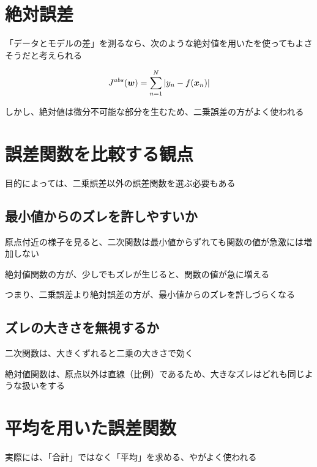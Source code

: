 \documentclass[../../../topic_machine-learning]{subfiles}
\begin{document}
\sectionline
\section{絶対誤差}

「データとモデルの差」を測るなら、次のような絶対値を用いたを使ってもよさそうだと考えられる

\begin{equation*}
  J^{abs}(\vb*{w}) = \sum_{n=1}^N \left| y_n - f(\vb*{x}_n) \right|
\end{equation*}

しかし、絶対値は微分不可能な部分を生むため、二乗誤差の方がよく使われる

\sectionline
\section{誤差関数を比較する観点}

目的によっては、二乗誤差以外の誤差関数を選ぶ必要もある

\subsection{最小値からのズレを許しやすいか}

原点付近の様子を見ると、二次関数は最小値からずれても関数の値が急激には増加しない

絶対値関数の方が、少しでもズレが生じると、関数の値が急に増える

\br

つまり、二乗誤差より絶対誤差の方が、最小値からのズレを許しづらくなる

\subsection{ズレの大きさを無視するか}

二次関数は、大きくずれると二乗の大きさで効く

絶対値関数は、原点以外は直線（比例）であるため、大きなズレはどれも同じような扱いをする

\sectionline
\section{平均を用いた誤差関数}

実際には、「合計」ではなく「平均」を求める、やがよく使われる
\end{document}
